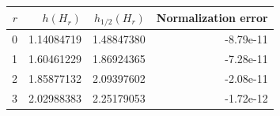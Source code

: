 \begin{tabular}{rrrr}
\toprule
$r$ & $h(H_r)$ & $h_{1/2}(H_r)$ & Normalization error\\
\midrule
0 & 1.14084719 & 1.48847380 & -8.79e-11 \\
1 & 1.60461229 & 1.86924365 & -7.28e-11 \\
2 & 1.85877132 & 2.09397602 & -2.08e-11 \\
3 & 2.02988383 & 2.25179053 & -1.72e-12 \\
\bottomrule
\end{tabular}
